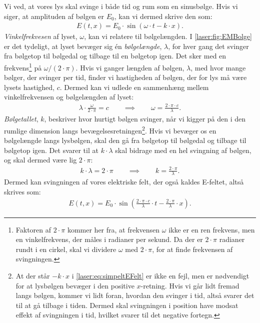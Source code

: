 \documentclass[crop=false, class=memoir]{standalone}
\begin{document}
Vi ved, at vores lys skal svinge i både tid og rum som en sinusbølge. Hvis vi siger, at amplituden af bølgen er $E_0$, kan vi dermed skrive den som:
%
\begin{align}\label{laser:eq:simpeltEFelt}
    E(t, x) = E_0  \cdot \sin(\omega\cdot t - k\cdot x).
\end{align}
%
\emph{Vinkelfrekvesen} af lyset, $\omega$, kan vi relatere til bølgelængden. I \cref{laser:fig:EMBolge} er det tydeligt, at lyset bevæger sig én \emph{bølgelængde}, $\lambda$, for hver gang det svinger fra bølgetop til bølgedal og tilbage til en bølgetop igen. Det sker med en frekvens\footnote{Faktoren af $2\cdot\pi$ kommer her fra, at frekvensen $\omega$ ikke er en ren frekvens, men en vinkelfrekvens, der måles i radianer per sekund. Da der er $2\cdot\pi$ radianer rundt i en cirkel, skal vi dividere $\omega$ med $2\cdot\pi$, for at finde frekvensen af svingningen.} på $\omega/(2\cdot\pi)$. Hvis vi ganger længden af bølgen, $\lambda$, med hvor mange bølger, der svinger per tid, finder vi hastigheden af bølgen, der for lys må være lysets hastighed, $c$. Dermed kan vi udlede en sammenhæng mellem vinkelfrekvensen og bølgelængden af lyset:
%
\begin{align}
    \lambda \cdot \frac{\omega}{2\cdot\pi} = c \qquad \implies \qquad \omega = \frac{2\cdot\pi\cdot c}{\lambda}.
\end{align}
%
\emph{Bølgetallet}, $k$, beskriver hvor hurtigt bølgen svinger, når vi kigger på den i den rumlige dimension langs bevægelsesretningen\footnote{At der står $-k\cdot x$ i \cref{laser:eq:simpeltEFelt} er ikke en fejl, men er nødvendigt for at lysbølgen bevæger i den positive $x$-retning. Hvis vi går lidt fremad langs bølgen, kommer vi lidt foran, hvordan den svinger i tid, altså svarer det til at gå tilbage i tiden. Dermed skal svingningen i position have modsat effekt af svingningen i tid, hvilket svarer til det negative fortegn.}. Hvis vi bevæger os en bølgelængde langs lysbølgen, skal den gå fra bølgetop til bølgedal og tilbage til bølgetop igen. Det svarer til at $k\cdot \lambda$ skal bidrage med en hel svingning af bølgen, og skal dermed være lig $2\cdot \pi$:
%
\begin{align}
    k \cdot \lambda = 2\cdot \pi \qquad \implies \qquad k = \frac{2\cdot \pi}{\lambda}.
\end{align}
%
Dermed kan svingningen af vores elektriske felt, der også kaldes E-feltet, altså skrives som:
%
\begin{align}
    E(t, x) = E_0 \cdot \sin\left(\frac{2\cdot\pi\cdot c}{\lambda} \cdot t - \frac{2\cdot\pi}{\lambda} \cdot x\right).  
\end{align}
\end{document}
